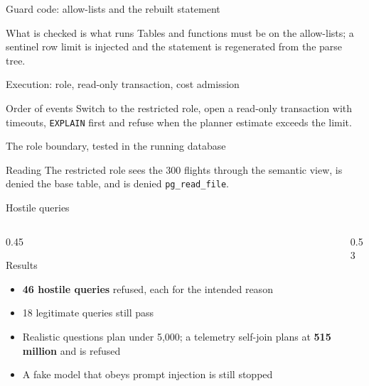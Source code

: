 \documentclass[aspectratio=169,10pt]{beamer}
\newcommand{\code}[1]{\texttt{\footnotesize #1}}
\newcommand{\terminal}[1]{}
\newcommand{\listingr}[3]{}
\begin{document}
\begin{frame}{Guard code: allow-lists and the rebuilt statement}
\begin{block}{What is checked is what runs}
Tables and functions must be on the allow-lists; a sentinel row limit is injected and the statement is regenerated from the parse tree.
\end{block}
\vspace{0.3em}
\listingr{code-guard-2}{1}{18}
\end{frame}

\begin{frame}{Execution: role, read-only transaction, cost admission}
\begin{block}{Order of events}
Switch to the restricted role, open a read-only transaction with timeouts, \code{EXPLAIN} first and refuse when the planner estimate exceeds the limit.
\end{block}
\vspace{0.3em}
\listingr{code-execute}{1}{20}
\end{frame}

\begin{frame}{The role boundary, tested in the running database}
\begin{block}{Reading}
The restricted role sees the 300 flights through the semantic view, is denied the base table, and is denied \code{pg\_read\_file}.
\end{block}
\vspace{0.3em}
\terminal{term-role}
\end{frame}

\begin{frame}[shrink=5]{Hostile queries}
\begin{columns}[T]
\begin{column}{0.45\textwidth}
\begin{block}{Results}
\begin{itemize}
  \item \textbf{46 hostile queries} refused, each for the intended reason
  \item 18 legitimate queries still pass
  \item Realistic questions plan under 5,000; a telemetry self-join plans at \textbf{515 million} and is refused
  \item A fake model that obeys prompt injection is still stopped
\end{itemize}
\end{block}
\end{column}
\begin{column}{0.53\textwidth}
\listingr{code-hostile}{1}{14}
\end{column}
\end{columns}
\end{frame}
\end{document}
